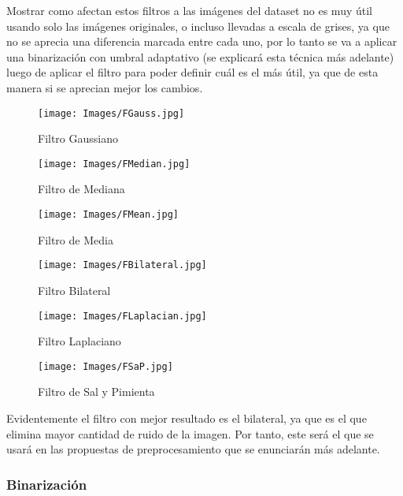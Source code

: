 \documentclass{article}
\begin{document}
Mostrar como afectan estos filtros a las imágenes del dataset no es muy útil usando solo las imágenes originales, o incluso llevadas a escala de grises, ya que no se aprecia una diferencia marcada entre cada uno, por lo tanto se va a aplicar una binarización con umbral adaptativo (se explicará esta técnica más adelante) luego de aplicar el filtro para poder definir cuál es el más útil, ya que de esta manera si se aprecian mejor los cambios.

\begin{figure}[!h]
    \centering
    \texttt{[image: Images/FGauss.jpg]}
    \caption{Filtro Gaussiano}
    \label{fig:enter-label}
\end{figure}

\begin{figure}[!h]
    \centering
    \texttt{[image: Images/FMedian.jpg]}
    \caption{Filtro de Mediana}
    \label{fig:enter-label}
\end{figure}

\begin{figure}[!h]
    \centering
    \texttt{[image: Images/FMean.jpg]}
    \caption{Filtro de Media}
    \label{fig:enter-label}
\end{figure}

\begin{figure}[!h]
    \centering
    \texttt{[image: Images/FBilateral.jpg]}
    \caption{Filtro Bilateral}
    \label{fig:enter-label}
\end{figure}

\begin{figure}[!h]
    \centering
    \texttt{[image: Images/FLaplacian.jpg]}
    \caption{Filtro Laplaciano}
    \label{fig:enter-label}
\end{figure}

\begin{figure}[!h]
    \centering
    \texttt{[image: Images/FSaP.jpg]}
    \caption{Filtro de Sal y Pimienta}
    \label{fig:enter-label}
\end{figure}

Evidentemente el filtro con mejor resultado es el bilateral, ya que es el que elimina mayor cantidad de ruido de la imagen. Por tanto, este será el que se usará en las propuestas de preprocesamiento que se enunciarán más adelante.

\subsubsection{Binarización}
\end{document}
